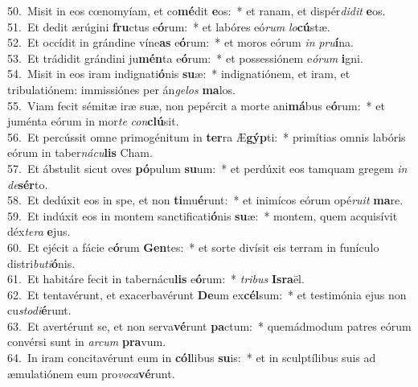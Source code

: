 {50.~}Misit in eos cœnomyíam, et co\textbf{mé}dit \textbf{e}os:~* et ranam, et dispér\textit{di}\textit{dit} \textbf{e}os.\\
{51.~}Et dedit ærúgini \textbf{fru}ctus e\textbf{ó}rum:~* et labóres eó\textit{rum} \textit{lo}\textbf{cú}stæ.\\
{52.~}Et occídit in grándine víne\textbf{as} e\textbf{ó}rum:~* et moros eórum \textit{in} \textit{pru}\textbf{í}na.\\
{53.~}Et trádidit grándini ju\textbf{mén}ta e\textbf{ó}rum:~* et possessiónem e\textit{ó}\textit{rum} \textbf{i}gni.\\
{54.~}Misit in eos iram indignati\textbf{ó}nis \textbf{su}æ:~* indignatiónem, et iram, et tribulatiónem: immissiónes per án\textit{ge}\textit{los} \textbf{ma}los.\\
{55.~}Viam fecit sémitæ iræ suæ, non pepércit a morte ani\textbf{má}bus e\textbf{ó}rum:~* et juménta eórum in mor\textit{te} \textit{con}\textbf{clú}sit.\\
{56.~}Et percússit omne primogénitum in \textbf{ter}ra Æ\textbf{gýp}ti:~* primítias omnis labóris eórum in taber\textit{ná}\textit{cu}\textbf{lis} Cham.\\
{57.~}Et ábstulit sicut oves \textbf{pó}pulum \textbf{su}um:~* et perdúxit eos tamquam gregem \textit{in} \textit{de}\textbf{sér}to.\\
{58.~}Et dedúxit eos in spe, et non \textbf{ti}mu\textbf{é}runt:~* et inimícos eórum opé\textit{ru}\textit{it} \textbf{ma}re.\\
{59.~}Et indúxit eos in montem sanctificati\textbf{ó}nis \textbf{su}æ:~* montem, quem acquisívit déx\textit{te}\textit{ra} \textbf{e}jus.\\
{60.~}Et ejécit a fácie e\textbf{ó}rum \textbf{Gen}tes:~* et sorte divísit eis terram in funículo distri\textit{bu}\textit{ti}\textbf{ó}nis.\\
{61.~}Et habitáre fecit in tabernácu\textbf{lis} e\textbf{ó}rum:~* \textit{tri}\textit{bus} \textbf{Is}\textbf{ra}ël.\\
{62.~}Et tentavérunt, et exacerbavérunt \textbf{De}um ex\textbf{cél}sum:~* et testimónia ejus non cu\textit{sto}\textit{di}\textbf{é}runt.\\
{63.~}Et avertérunt se, et non serva\textbf{vé}runt \textbf{pa}ctum:~* quemádmodum patres eórum convérsi sunt in \textit{ar}\textit{cum} \textbf{pra}vum.\\
{64.~}In iram concitavérunt eum in \textbf{cól}libus \textbf{su}is:~* et in sculptílibus suis ad æmulatiónem eum pro\textit{vo}\textit{ca}\textbf{vé}runt.\\

